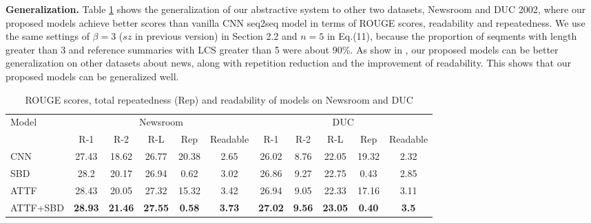 \documentclass{nle}
\theoremstyle{definition}
\newcommand{\tabref}[1]{Table \ref{#1}}
\begin{document}
\textbf{Generalization.} 
\tabref{tab:generalization} shows the generalization of our abstractive system to other two datasets, Newsroom and DUC 2002, where our
proposed models achieve better scores than vanilla CNN seq2seq model in terms of ROUGE scores, readability and repeatedness. 
We use the same settings of $\beta=3$ ($sz$ in previous version) in Section 2.2 and $n=5$ in Eq.(11), because the proportion of seqments with length greater than 3 and reference summaries with LCS greater than 5 were about 90\%. As show in , our proposed models can be better generalization on other datasets about news, along with repetition reduction and the improvement of readability.
This shows that our proposed models can be generalized well.
\begin{table}[th!]
	\begin{center}
		\caption{ROUGE scores, total repeatedness (Rep) and readability of models on Newsroom and DUC}
		\begin{tabular}{|l|c|c|c|c|c|c|c|c|c|c|}
			\hline
			\multirow{2}{*}{Model} & \multicolumn{5}{|c|}{Newsroom} &\multicolumn{5}{|c|}{DUC} \\
			\cline{2-11}
			&R-1 & R-2 & R-L& Rep & Readable &R-1 & R-2 & R-L & Rep & Readable\\
			\hline
			CNN &  27.43 & 18.62 & 26.77 & 20.38 & 2.65 & 26.02 & 8.76 & 22.05& 19.32 & 2.32 \\
			SBD &  28.2 & 20.17 & 26.94 & 0.62 & 3.02 & 26.86 & 9.27 & 22.75& 0.43 & 2.85 \\
			ATTF &  28.43 & 20.05 & 27.32 & 15.32 & 3.42 & 26.94 & 9.05 & 22.33& 17.16 & 3.11 \\
			ATTF+SBD &  \bf 28.93& \bf 21.46 & \bf 27.55 & \bf 0.58 & \bf 3.73 & \bf 27.02 & \bf 9.56 & \bf 23.05& \bf 0.40 & \bf 3.5 \\
			\hline
		\end{tabular}
		\label{tab:generalization}
	\end{center}
\end{table}
\end{document}
